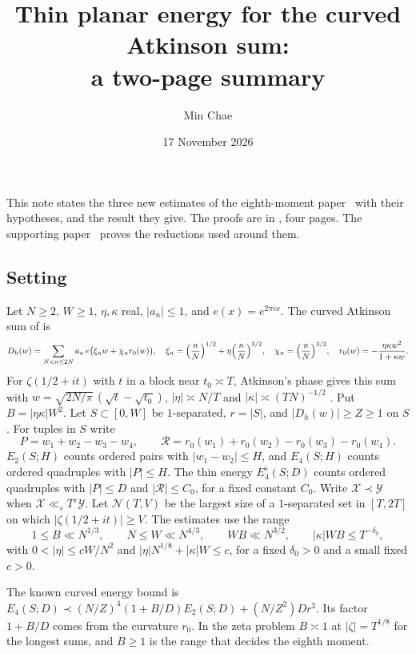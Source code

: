 \documentclass[10pt]{amsart}
\title[Thin planar energy: summary]{Thin planar energy for the curved Atkinson sum:\\ a two-page summary}
\author{Min Chae}
\date{17 November 2026}
\newcommand{\cN}{\mathcal N}
\newcommand{\cR}{\mathcal R}
\begin{document}
\maketitle
\thispagestyle{empty}

This note states the three new estimates of the eighth-moment
paper~\cite{Thin} with their hypotheses, and the result they give.
The proofs are in \cite[Sections~\ref*{p-sec:geometry}
and~\ref*{p-sec:thinsupport}]{Thin}, four pages. The supporting
paper~\cite{Weighted} proves the reductions used around them.

\subsection*{Setting}
Let $N\ge2$, $W\ge1$, $\eta,\kappa$ real, $|a_n|\le1$, and
$e(x)=e^{2\pi ix}$. The curved Atkinson sum of \cite{B38} is
\[
 D_h(w)=\sum_{N<n\le2N}a_n\,e\bigl(\xi_nw+\chi_nr_0(w)\bigr),\quad
 \xi_n=\Bigl(\frac nN\Bigr)^{1/2}+\eta\Bigl(\frac nN\Bigr)^{3/2},\quad
 \chi_n=\Bigl(\frac nN\Bigr)^{3/2},\quad
 r_0(w)=-\frac{\eta\kappa w^2}{1+\kappa w}.
\]
For $\zeta(1/2+it)$ with $t$ in a block near $t_0\asymp T$, Atkinson's
phase gives this sum with $w=\sqrt{2N/\pi}\,(\sqrt t-\sqrt{t_0})$,
$|\eta|\asymp N/T$ and $|\kappa|\asymp(TN)^{-1/2}$
\cite[Lemma~\ref*{six-lem:atkinson}]{Weighted}.
Put $B=|\eta\kappa|W^2$. Let $S\subset[0,W]$ be $1$-separated, $r=|S|$,
and $|D_h(w)|\ge Z\ge1$ on $S$. For tuples in $S$ write
\[
 P=w_1+w_2-w_3-w_4,\qquad
 \cR=r_0(w_1)+r_0(w_2)-r_0(w_3)-r_0(w_4).
\]
$E_2(S;H)$ counts ordered pairs with $|w_1-w_2|\le H$, and $E_4(S;H)$
counts ordered quadruples with $|P|\le H$. The thin energy
$E_4^\flat(S;D)$ counts ordered quadruples with $|P|\le D$ and
$|\cR|\le C_0$, for a fixed constant $C_0$.
Write $\mathcal X\prec\mathcal Y$ when
$\mathcal X\ll_\varepsilon T^\varepsilon\mathcal Y$.
Let $\cN(T,V)$ be the largest size of a $1$-separated set in $[T,2T]$
on which $|\zeta(1/2+it)|\ge V$.
The estimates use the range
\begin{equation}\label{eq:range}
 1\le B\ll N^{1/3},\qquad N\le W\ll N^{4/3},\qquad
 WB\ll N^{3/2},\qquad |\kappa|WB\le T^{-\delta_0},
\end{equation}
with $0<|\eta|\le cW/N^2$ and $|\eta|N^{1/8}+|\kappa|W\le c$, for a fixed
$\delta_0>0$ and a small fixed $c>0$.

The known curved energy bound
\cite[Proposition~\ref*{six-prop:curv}]{Weighted} is
$E_4(S;D)\prec(N/Z)^4(1+B/D)E_2(S;D)+(N/Z^2)Dr^3$.
Its factor $1+B/D$ comes from the curvature $r_0$. In the zeta problem
$B\asymp1$ at $|\zeta|=T^{1/8}$ for the longest sums, and $B\ge1$ is the range
that decides the eighth moment.
\end{document}
